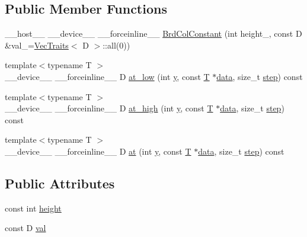 \subsection*{Public Member Functions}
\begin{DoxyCompactItemize}
\item 
\-\_\-\-\_\-host\-\_\-\-\_\- \-\_\-\-\_\-device\-\_\-\-\_\- \-\_\-\-\_\-forceinline\-\_\-\-\_\- \hyperlink{structcv_1_1gpu_1_1device_1_1BrdColConstant_aa6b1ce3fc93d1161bdb6c63962b705f6}{Brd\-Col\-Constant} (int height\-\_\-, const D \&val\-\_\-=\hyperlink{structcv_1_1gpu_1_1device_1_1VecTraits}{Vec\-Traits}$<$ D $>$\-::all(0))
\item 
{\footnotesize template$<$typename T $>$ }\\\-\_\-\-\_\-device\-\_\-\-\_\- \-\_\-\-\_\-forceinline\-\_\-\-\_\- D \hyperlink{structcv_1_1gpu_1_1device_1_1BrdColConstant_a79fcc6c5010328e654e8f4b2b76d751d}{at\-\_\-low} (int \hyperlink{highgui__c_8h_af1202c02b14870c18fb3a1da73e9e7c7}{y}, const \hyperlink{calib3d_8hpp_a3efb9551a871ddd0463079a808916717}{T} $\ast$\hyperlink{legacy_8hpp_ab9fe6c09e6d02865a953fffc12fe6ca0}{data}, size\-\_\-t \hyperlink{legacy_8hpp_abc16e65f240ed0c8f3e876e8732c0a33}{step}) const 
\item 
{\footnotesize template$<$typename T $>$ }\\\-\_\-\-\_\-device\-\_\-\-\_\- \-\_\-\-\_\-forceinline\-\_\-\-\_\- D \hyperlink{structcv_1_1gpu_1_1device_1_1BrdColConstant_acf7716a806756d08859840496ca01302}{at\-\_\-high} (int \hyperlink{highgui__c_8h_af1202c02b14870c18fb3a1da73e9e7c7}{y}, const \hyperlink{calib3d_8hpp_a3efb9551a871ddd0463079a808916717}{T} $\ast$\hyperlink{legacy_8hpp_ab9fe6c09e6d02865a953fffc12fe6ca0}{data}, size\-\_\-t \hyperlink{legacy_8hpp_abc16e65f240ed0c8f3e876e8732c0a33}{step}) const 
\item 
{\footnotesize template$<$typename T $>$ }\\\-\_\-\-\_\-device\-\_\-\-\_\- \-\_\-\-\_\-forceinline\-\_\-\-\_\- D \hyperlink{structcv_1_1gpu_1_1device_1_1BrdColConstant_a4c1755eb05c8b64732192b4e6ed560ea}{at} (int \hyperlink{highgui__c_8h_af1202c02b14870c18fb3a1da73e9e7c7}{y}, const \hyperlink{calib3d_8hpp_a3efb9551a871ddd0463079a808916717}{T} $\ast$\hyperlink{legacy_8hpp_ab9fe6c09e6d02865a953fffc12fe6ca0}{data}, size\-\_\-t \hyperlink{legacy_8hpp_abc16e65f240ed0c8f3e876e8732c0a33}{step}) const 
\end{DoxyCompactItemize}
\subsection*{Public Attributes}
\begin{DoxyCompactItemize}
\item 
const int \hyperlink{structcv_1_1gpu_1_1device_1_1BrdColConstant_a6fc5fc1ed96b7f3a476e8b1802d5bdde}{height}
\item 
const D \hyperlink{structcv_1_1gpu_1_1device_1_1BrdColConstant_a8391967c0ef1f13709ad854a488ef840}{val}
\end{DoxyCompactItemize}


